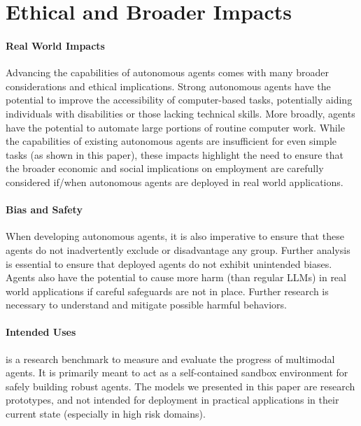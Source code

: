 \section{Ethical and Broader Impacts}

\paragraph{Real World Impacts} Advancing the capabilities of autonomous agents comes with many broader considerations and ethical implications. Strong autonomous agents have the potential to improve the accessibility of computer-based tasks, potentially aiding individuals with disabilities or those lacking technical skills. More broadly, agents have the potential to automate large portions of routine computer work. While the capabilities of existing autonomous agents are insufficient for even simple tasks (as shown in this paper), these impacts highlight the need to ensure that the broader economic and social implications on employment are carefully considered if/when autonomous agents are deployed in real world applications.

\paragraph{Bias and Safety}  When developing autonomous agents, it is also imperative to ensure that these agents do not inadvertently exclude or disadvantage any group. Further analysis is essential to ensure that deployed agents do not exhibit unintended biases. Agents also have the potential to cause more harm (than regular LLMs) in real world applications if careful safeguards are not in place. Further research is necessary to understand and mitigate possible harmful behaviors.

\paragraph{Intended Uses} \BenchmarkName{} is a research benchmark to measure and evaluate the progress of multimodal agents. It is primarily meant to act as a self-contained sandbox environment for safely building robust agents. The models we presented in this paper are research prototypes, and not intended for deployment in practical applications in their current state (especially in high risk domains).